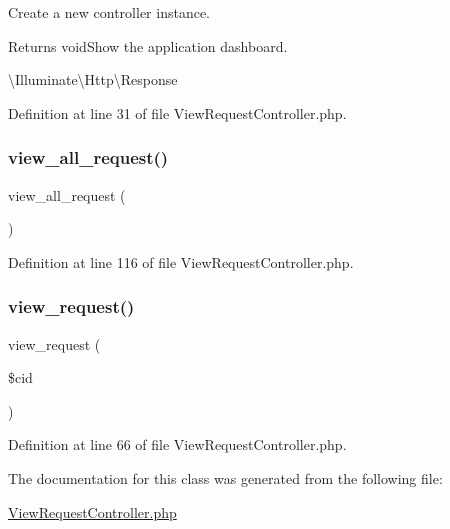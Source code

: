 Create a new controller instance.

\begin{DoxyReturn}{Returns}
void\+Show the application dashboard.

\textbackslash{}\+Illuminate\textbackslash{}\+Http\textbackslash{}\+Response 
\end{DoxyReturn}


Definition at line 31 of file View\+Request\+Controller.\+php.

\mbox{\label{class_responsive_1_1_http_1_1_controllers_1_1_view_request_controller_af4b31f030fbbe74634114e820c3a13a0}} 
\subsubsection{\texorpdfstring{view\_all\_request()}{view\_all\_request()}}
{\footnotesize\ttfamily view\+\_\+all\+\_\+request (\begin{DoxyParamCaption}{ }\end{DoxyParamCaption})}



Definition at line 116 of file View\+Request\+Controller.\+php.

\mbox{\label{class_responsive_1_1_http_1_1_controllers_1_1_view_request_controller_abfa75d62e37dbdf13698da2a79b859e0}} 
\subsubsection{\texorpdfstring{view\_request()}{view\_request()}}
{\footnotesize\ttfamily view\+\_\+request (\begin{DoxyParamCaption}\item[{}]{\$cid }\end{DoxyParamCaption})}



Definition at line 66 of file View\+Request\+Controller.\+php.



The documentation for this class was generated from the following file\+:\begin{DoxyCompactItemize}
\item 
\mbox{\hyperlink{_view_request_controller_8php}{View\+Request\+Controller.\+php}}\end{DoxyCompactItemize}

